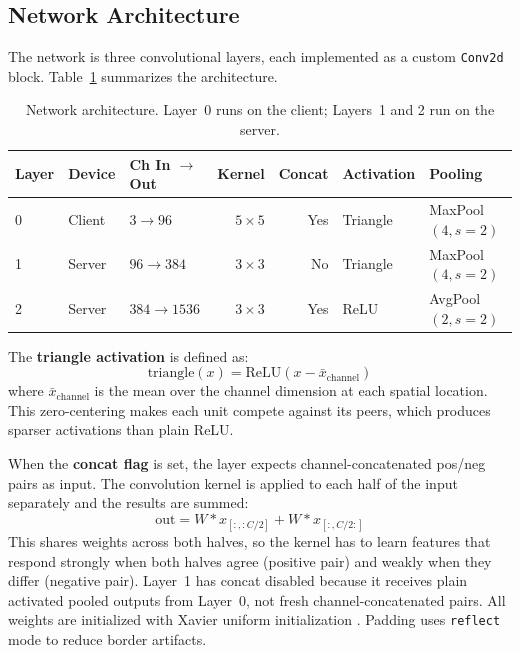 \documentclass[12pt]{article}
\begin{document}
\subsection{Network Architecture}

The network is three convolutional layers, each implemented as a custom \texttt{Conv2d} block.
Table~\ref{tab:arch} summarizes the architecture.

\begin{table}[htbp]
  \centering
  \caption{Network architecture. Layer~0 runs on the client; Layers~1 and 2 run on the server.}
  \label{tab:arch}
  \begin{tabular}{lllrrll}
    \toprule
    Layer & Device & Ch In $\to$ Out & Kernel & Concat & Activation & Pooling \\
    \midrule
    0 & Client & $3 \to 96$     & $5\times5$ & Yes & Triangle & MaxPool$(4, s{=}2)$ \\
    1 & Server & $96 \to 384$   & $3\times3$ & No  & Triangle & MaxPool$(4, s{=}2)$ \\
    2 & Server & $384 \to 1536$ & $3\times3$ & Yes & ReLU     & AvgPool$(2, s{=}2)$ \\
    \bottomrule
  \end{tabular}
\end{table}

The \textbf{triangle activation} is defined as:
\begin{equation}
  \text{triangle}(x) = \text{ReLU}\!\left(x - \bar{x}_{\text{channel}}\right)
\end{equation}
where $\bar{x}_{\text{channel}}$ is the mean over the channel dimension at each spatial
location. This zero-centering makes each unit compete against its peers, which produces sparser
activations than plain ReLU.

When the \textbf{concat flag} is set, the layer expects channel-concatenated pos/neg pairs as
input. The convolution kernel is applied to each half of the input separately and the results
are summed:
\begin{equation}
  \text{out} = W \ast x_{[:, :C/2]} + W \ast x_{[:, C/2:]}
\end{equation}
This shares weights across both halves, so the kernel has to learn features that respond
strongly when both halves agree (positive pair) and weakly when they differ (negative pair).
Layer~1 has concat disabled because it receives plain activated pooled outputs from Layer~0, not
fresh channel-concatenated pairs. All weights are initialized with Xavier uniform initialization
\citep{bengio2007greedy}. Padding uses \texttt{reflect} mode to reduce border artifacts.
\end{document}
